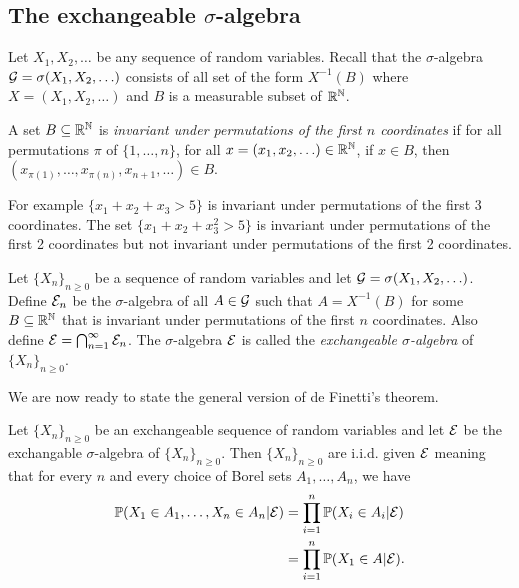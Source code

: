 \subsection{The exchangeable $\sigma$-algebra}
Let $X_1,X_2,\ldots$ be any sequence of random variables. Recall that the $\sigma$-algebra ${\mathcal{G}} = \sigma(X_1,X_2,\ldots)$ consists of all set of the form $X^{-1}(B)$ where $X=(X_1,X_2,\ldots)$ and $B$ is a measurable subset of ${\mathbb R}^{{\mathbb N}}$.
\begin{definition}
    A set $B \subseteq {\mathbb R}^{{\mathbb N}}$ is \emph{invariant under permutations of the first $n$ coordinates} if for all permutations $\pi$ of $\{1,\ldots,n\}$, for all $x=(x_1,x_2,\ldots) \in {\mathbb R}^{{\mathbb N}}$, if $x \in B$, then $(x_{\pi(1)},\ldots, x_{\pi(n)}, x_{n+1},\ldots) \in B$.
\end{definition}
For example $\{x_1+x_2+x_3 > 5\}$ is invariant under permutations of the first 3 coordinates. The set $\{x_1+x_2+x_3^2 > 5\}$ is invariant under permutations of the first 2 coordinates but not invariant under permutations of the first 2 coordinates.
\begin{definition}
    Let $\{X_n\}_{n\ge 0}$ be a sequence of random variables and let ${\mathcal{G}} = \sigma(X_1,X_2,\ldots)$. Define ${\mathcal{E}}_n$ be the $\sigma$-algebra of all $A \in {\mathcal{G}}$ such that $A = X^{-1}(B)$ for some $B \subseteq {\mathbb R}^{{\mathbb N}}$ that is invariant under permutations of the first $n$ coordinates. Also define ${\mathcal{E}} = \bigcap_{n=1}^\infty {\mathcal{E}}_n$. The $\sigma$-algebra ${\mathcal{E}}$ is called the \emph{exchangeable $\sigma$-algebra} of $\{X_n\}_{n \ge 0}$.
\end{definition}
We are now ready to state the general version of de Finetti's theorem.
\begin{theorem}
    Let $\{X_n\}_{n \ge 0}$ be an exchangeable sequence of random variables and let ${\mathcal{E}}$ be the exchangable $\sigma$-algebra of $\{X_n\}_{n \ge 0}$. Then $\{X_n\}_{n \ge 0}$ are i.i.d. given ${\mathcal{E}}$ meaning that for every $n$ and every choice of Borel sets $A_1,\ldots,A_n$, we have
    \begin{align*}
        {\mathbb{P}}(X_1 \in A_1,\ldots,X_n \in A_n|{\mathcal{E}}) &=\prod_{i=1}^n {\mathbb{P}}(X_i \in A_i |{\mathcal{E}})\\
        &=\prod_{i=1}^n {\mathbb{P}}(X_1 \in A|{\mathcal{E}}).
    \end{align*}
\end{theorem}
